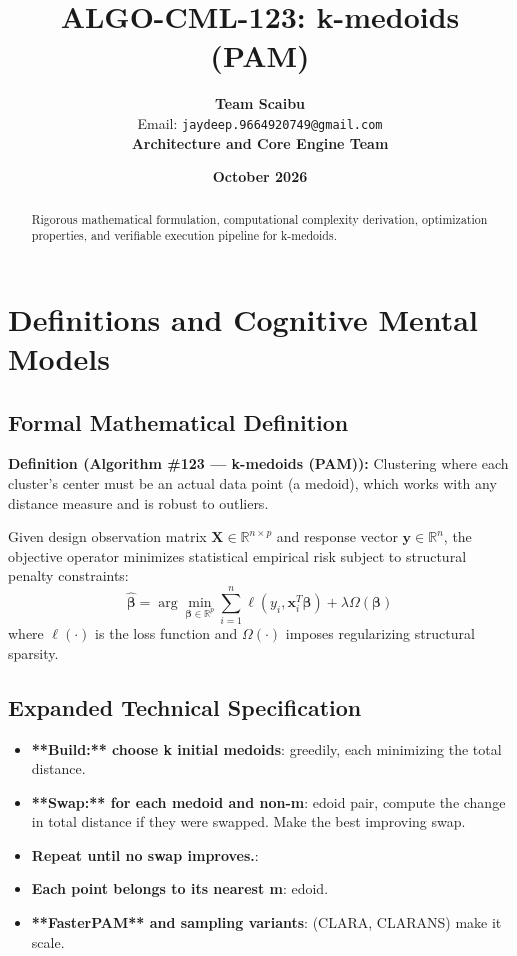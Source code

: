 \documentclass[11pt,a4paper]{article}
\title{\textbf{ALGO-CML-123: k-medoids (PAM)}}
\author{\textbf{Team Scaibu} \\ \small Email: \texttt{jaydeep.9664920749@gmail.com} \\ \small \textbf{Architecture and Core Engine Team}}
\date{\textbf{October 2026}}
\theoremstyle{definition}
\begin{document}
\maketitle

\begin{abstract}
Rigorous mathematical formulation, computational complexity derivation, optimization properties, and verifiable execution pipeline for k-medoids.
\end{abstract}

\section{Definitions and Cognitive Mental Models}

\subsection{Formal Mathematical Definition}
\textbf{Definition (Algorithm \#123 --- k-medoids (PAM)):}
Clustering where each cluster's center must be an actual data point (a medoid), which works with any distance measure and is robust to outliers.

Given design observation matrix $\mathbf{X} \in \mathbb{R}^{n \times p}$ and response vector $\mathbf{y} \in \mathbb{R}^n$, the objective operator minimizes statistical empirical risk subject to structural penalty constraints:
\begin{equation}
\hat{\boldsymbol{\beta}} = \arg\min_{\boldsymbol{\beta} \in \mathbb{R}^p} \sum_{i=1}^n \ell(y_i, \mathbf{x}_i^T \boldsymbol{\beta}) + \lambda \Omega(\boldsymbol{\beta})
\end{equation}
where $\ell(\cdot)$ is the loss function and $\Omega(\cdot)$ imposes regularizing structural sparsity.

\subsection{Expanded Technical Specification}
\begin{itemize}
\item \textbf{**Build:** choose k initial medoids}:  greedily, each minimizing the total distance.
\item \textbf{**Swap:** for each medoid and non-m}: edoid pair, compute the change in total distance if they were swapped. Make the best improving swap.
\item \textbf{Repeat until no swap improves.}: 
\item \textbf{Each point belongs to its nearest m}: edoid.
\item \textbf{**FasterPAM** and sampling variants}:  (CLARA, CLARANS) make it scale.
\end{itemize}
\end{document}
